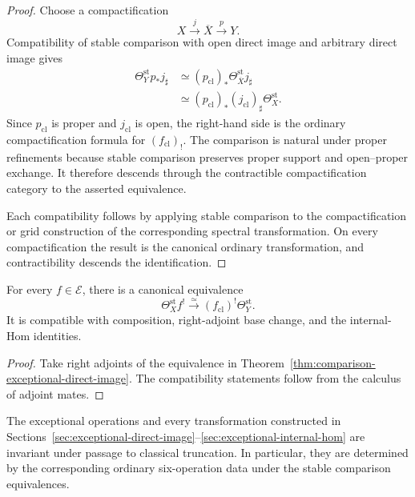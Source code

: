 \begin{proof}
Choose a compactification
\[
    X\xrightarrow{j}\overline X\xrightarrow{p}Y.
\]
Compatibility of stable comparison with open direct image and arbitrary
direct image gives
\[
\begin{aligned}
    \Theta_Y^{\mathrm{st}}p_*j_\sharp
    &\simeq
    (p_{\mathrm{cl}})_*
    \Theta_{\overline X}^{\mathrm{st}}j_\sharp \\
    &\simeq
    (p_{\mathrm{cl}})_*
    (j_{\mathrm{cl}})_\sharp
    \Theta_X^{\mathrm{st}}.
\end{aligned}
\]
Since \(p_{\mathrm{cl}}\) is proper and \(j_{\mathrm{cl}}\) is open, the
right-hand side is the ordinary compactification formula for
\((f_{\mathrm{cl}})_!\).  The comparison is natural under proper
refinements because stable comparison preserves proper support and
open--proper exchange.  It therefore descends through the contractible
compactification category to the asserted equivalence.

Each compatibility follows by applying stable comparison to the
compactification or grid construction of the corresponding spectral
transformation.  On every compactification the result is the canonical
ordinary transformation, and contractibility descends the identification.
\end{proof}

\begin{corollary}
\label{cor:comparison-exceptional-inverse-image}
For every \(f\in\mathcal E\), there is a canonical equivalence
\[
    \Theta_X^{\mathrm{st}}f^!
    \xrightarrow{\simeq}
    (f_{\mathrm{cl}})^!
    \Theta_Y^{\mathrm{st}}.
\]
It is compatible with composition, right-adjoint base change, and the
internal-Hom identities.
\end{corollary}

\begin{proof}
Take right adjoints of the equivalence in
Theorem~\ref{thm:comparison-exceptional-direct-image}.  The compatibility
statements follow from the calculus of adjoint mates.
\end{proof}

\begin{corollary}
\label{cor:exceptional-derived-invariance}
The exceptional operations and every transformation constructed in
Sections~\ref{sec:exceptional-direct-image}--\ref{sec:exceptional-internal-hom}
are invariant under passage to classical truncation.  In particular, they
are determined by the corresponding ordinary six-operation data under the
stable comparison equivalences.
\end{corollary}

